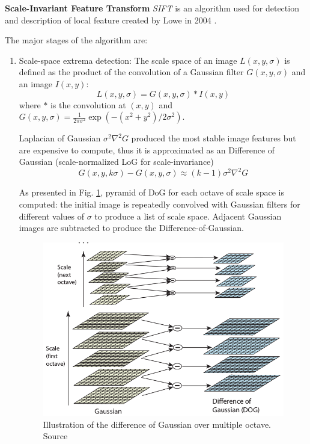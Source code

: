 \textbf{Scale-Invariant Feature Transform} \textit{SIFT} is an algorithm used for detection and description of local feature created by Lowe in 2004 \cite{Lowe2004}.

The major stages of the algorithm are:
\begin{enumerate}
    \item Scale-space extrema detection: The scale space of an image $L(x, y, \sigma)$ is defined as the product of the convolution of a Gaussian filter $G(x, y, \sigma)$ and an image $I(x, y)$:
    $$
    L(x, y, \sigma) = G(x, y, \sigma) * I(x, y)
    $$
    where $*$ is the convolution at $(x, y)$ and $G(x, y, \sigma) = \frac{1}{2 \pi \sigma^2} \exp(-(x^2 + y^2) / 2 \sigma^2)$.
    
    Laplacian of Gaussian $\sigma^2 \nabla^2 G$ produced the most stable image features but are expensive to compute, thus it is approximated as an Difference of Gaussian (scale-normalized LoG for scale-invariance)
    $$
    G(x, y, k \sigma) - G(x, y, \sigma) \approx (k - 1) \sigma^2 \nabla^2 G
    $$
    
    As presented in Fig. \ref{fig:sift_difference_of_gaussian}, pyramid of DoG for each octave of scale space is computed: the initial image is repeatedly convolved with Gaussian filters for different values of $\sigma$ to produce a list of scale space. Adjacent Gaussian images are subtracted to produce the Difference-of-Gaussian.
    
    \begin{figure}[h]
        \centering
        \includegraphics[scale=0.5]{img/sift_difference_of_gaussian.png}
        \caption[Illustration of the difference of Gaussian over multiple octave]{Illustration of the difference of Gaussian over multiple octave. Source \cite{Lowe2004}}
        \label{fig:sift_difference_of_gaussian}
    \end{figure}
    

\end{enumerate}
